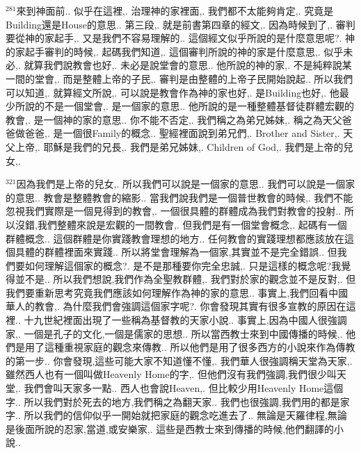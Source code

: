 \documentclass{book}
\begin{document}
$^{281}$來到神面前..
似乎在這裡,.
治理神的家裡面,.
我們都不太能夠肯定,.
究竟是Building還是House的意思..
第三段,.
就是前書第四章的經文,.
因為時候到了,.
審判要從神的家起手,.
又是我們不容易理解的..
這個經文似乎所說的是什麼意思呢?.
神的家起手審判的時候,.
起碼我們知道,.
這個審判所說的神的家是什麼意思,.
似乎未必,.
就算我們說教會也好,.
未必是說堂會的意思..
他所說的神的家,.
不是純粹說某一間的堂會,.
而是整體上帝的子民,.
審判是由整體的上帝子民開始說起..
所以我們可以知道,.
就算經文所說,.
可以說是教會作為神的家也好,.
是Building也好,.
他最少所說的不是一個堂會,.
是一個家的意思..
他所說的是一種整體基督徒群體宏觀的教會,.
是一個神的家的意思..
你不能不否定,.
我們稱之為弟兄姊妹,.
稱之為天父爸爸做爸爸,.
是一個很Family的概念..
聖經裡面說到弟兄們,.
Brother and Sister,.
天父上帝,.
耶穌是我們的兄長,.
我們是弟兄姊妹,.
Children of God,.
我們是上帝的兒女,.

$^{321}$因為我們是上帝的兒女,.
所以我們可以說是一個家的意思..
我們可以說是一個家的意思..
教會是整體教會的縮影..
當我們說我們是一個普世教會的時候,.
我們不能忽視我們實際是一個見得到的教會,.
一個很具體的群體成為我們對教會的投射..
所以沒錯,我們整體來說是宏觀的一間教會,.
但我們是有一個堂會概念,.
起碼有一個群體概念..
這個群體是你實踐教會理想的地方..
任何教會的實踐理想都應該放在這個具體的群體裡面來實踐..
所以將堂會理解為一個家,其實並不是完全錯誤..
但我們要如何理解這個家的概念?.
是不是那種要你完全忠誠,.
只是這樣的概念呢?我覺得並不是..
所以我們想說,我們作為全聖教群體,.
我們對於家的觀念並不是反對,.
但我們要重新思考究竟我們應該如何理解作為神的家的意思..
事實上,我們回看中國華人的教會,.
為什麼我們會強調這個家字呢?.
你會發現其實有很多宣教的原因在這裡..
十九世紀裡面出現了一些稱為基督教的天家小說..
事實上,因為中國人很強調家,.
一個是孔子的文化,一個是儒家的思想..
所以當西教士來到中國傳播的時候,.
他們是用了這種重視家庭的觀念來傳教..
所以他們是用了很多西方的小說來作為傳教的第一步..
你會發現,這些可能大家不知道懂不懂,.
我們華人很強調稱天堂為天家,.
雖然西人也有一個叫做Heavenly Home的字,.
但他們沒有我們強調,我們很少叫天堂,.
我們會叫天家多一點..
西人也會說Heaven,.
但比較少用Heavenly Home這個字..
所以我們對於死去的地方,我們稱之為翻天家..
我們也很強調,我們用的都是家字..
所以我們的信仰似乎一開始就把家庭的觀念吃進去了..
無論是天羅律程,無論是後面所說的忍家,當道,或安樂家,.
這些是西教士來到傳播的時候,他們翻譯的小說..
\end{document}
